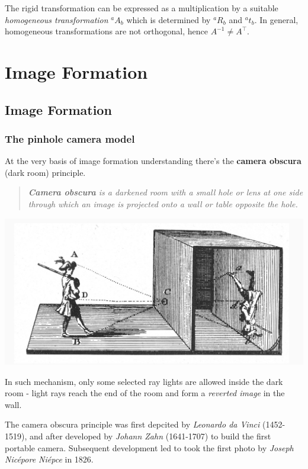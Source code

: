 \documentclass[10pt]{report}
\begin{document}
The rigid transformation can be expressed as a multiplication by a suitable \emph{homogeneous transformation} \({}^a A_b\) which is determined by \({}^a R_b\) and \({}^a t_b\). In general, homogeneous transformations are not orthogonal, hence \(A^{-1} \neq A^\top\).


\part{Image Formation}
\label{sec:org59dcdb2}
\chapter{Image Formation}
\label{sec:org8f36eb0}
\section{The pinhole camera model}
\label{sec:org08df902}
At the very basis of image formation understanding there's the \textbf{camera
obscura} (dark room) principle.

\begin{quote}
\emph{\textbf{Camera obscura} is a darkened room with a small hole or lens at one side through which an image is projected onto a wall or table opposite the hole.}
\end{quote}

\begin{center}
\includegraphics[width=.9\linewidth]{./pics/visio/camera-obscura.jpg}
\end{center}

In such mechanism, only some selected ray lights are allowed inside the
dark room - light rays reach the end of the room and form a \emph{reverted
image} in the wall.

The camera obscura principle was first depcited by \emph{Leonardo da Vinci}
(1452-1519), and after developed by \emph{Johann Zahn} (1641-1707) to build
the first portable camera. Subsequent development led to took the first
photo by \emph{Joseph Nicépore Niépce} in 1826.
\end{document}
